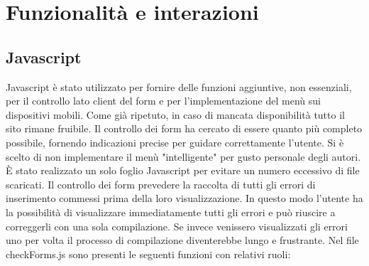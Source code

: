 \newpage
\section{Funzionalità e interazioni}
\subsection{Javascript}
Javascript è stato utilizzato per fornire delle funzioni aggiuntive, non essenziali, per il controllo lato client del form e per l'implementazione del menù sui dispositivi mobili. Come già ripetuto, in caso di mancata disponibilità tutto il sito rimane fruibile. 
Il controllo dei form ha cercato di essere quanto più completo possibile, fornendo indicazioni precise per guidare correttamente l'utente.
Si è scelto di non implementare il menù "intelligente" per gusto personale degli autori. 
È stato realizzato un solo foglio Javascript per evitare un numero eccessivo di file scaricati. Il controllo dei form prevedere la raccolta di tutti gli errori di inserimento commessi prima della loro visualizzazione. In questo modo l'utente ha la possibilità di visualizzare immediatamente tutti gli errori e può riuscire a correggerli con una sola compilazione. Se invece venissero visualizzati gli errori uno per volta il processo di compilazione diventerebbe lungo e frustrante.
Nel file checkForms.js sono presenti le seguenti funzioni con relativi ruoli:
